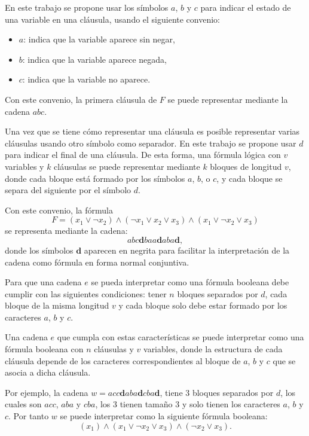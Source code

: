 \documentclass{article}
\begin{document}
En este trabajo se propone usar los símbolos $a$, $b$ y $c$ para indicar el estado de una variable en una cláusula, usando el siguiente convenio:

\begin{itemize}
    \item $a$: indica que la variable aparece sin negar,
    \item $b$: indica que la variable aparece negada,
    \item $c$: indica que la variable no aparece.
\end{itemize}

Con este convenio, la primera cláusula de $F$ se puede representar mediante la cadena $abc$.

Una vez que se tiene cómo representar una cláusula es posible representar varias cláusulas usando otro símbolo como separador.
En este trabajo se propone usar $d$ para indicar el final de una cláusula. De esta forma, una fórmula lógica con $v$ variables y $k$ cláusulas se puede representar mediante $k$ bloques de longitud $v$, donde cada bloque está formado por los símbolos $a$, $b$, o $c$, y cada bloque se separa del siguiente por el símbolo $d$.

Con este convenio, la fórmula
$$ F=(x_1 \vee \neg x_2) \wedge (\neg x_1 \vee x_2 \vee x_3) \wedge (x_1 \vee \neg x_2 \vee x_3)$$
se representa mediante la cadena:
$$abc\mathbf{d}baa\mathbf{d}aba\mathbf{d},$$
donde los símbolos $\mathbf{d}$ aparecen en negrita para facilitar la interpretación de la cadena como fórmula
en forma normal conjuntiva.

Para que una cadena $e$ se pueda interpretar como una fórmula booleana debe cumplir con las siguientes condiciones:
tener $n$ bloques separados por $d$, cada bloque de la misma longitud $v$ y cada bloque solo debe estar formado por los caracteres
$a$, $b$ y $c$.

Una cadena $e$ que cumpla con estas características  se puede interpretar como una fórmula booleana con $n$ cláusulas y $v$ variables, donde la estructura de cada cláusula depende de los caracteres correspondientes al bloque de $a$, $b$ y $c$ que se asocia a dicha cláusula.

Por ejemplo, la cadena $w=acc\mathbf{d}aba\mathbf{d}cba\mathbf{d}$, tiene 3 bloques separados por $d$, los cuales son $acc$, $aba$ y $cba$, los 3 tienen tamaño 3 y solo tienen los caracteres $a$, $b$ y $c$.
Por tanto  $w$ se puede interpretar como la siguiente fórmula booleana:
$$(x_1)\wedge(x_1\vee \neg x_2 \vee x_3) \wedge (\neg x_2\vee x_3).$$
\end{document}
